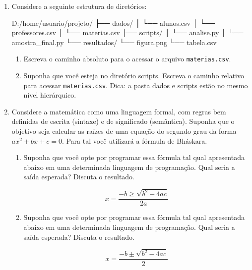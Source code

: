 \documentclass[
  brazilian,
  letterpaper,
  DIV=11,
  numbers=noendperiod]{scrreprt}
\newenvironment{Shaded}{\begin{snugshade}}{\end{snugshade}}
\newcommand{\NormalTok}[1]{\textcolor[rgb]{0.00,0.23,0.31}{#1}}
\providecommand{\tightlist}{%
  \setlength{\itemsep}{0pt}\setlength{\parskip}{0pt}}
\begin{document}
\begin{enumerate}
\def\labelenumi{\arabic{enumi}.}
\setcounter{enumi}{3}
\item
  Considere a seguinte estrutura de diretórios:

\begin{Shaded}
\begin{Highlighting}[]
\NormalTok{D:/home/usuario/projeto/}
\NormalTok{├── dados/}
\NormalTok{│   └── alunos.csv}
\NormalTok{│   └── professores.csv}
\NormalTok{│   └── materias.csv}
\NormalTok{├── scripts/}
\NormalTok{│   └── analise.py}
\NormalTok{│   └── amostra\_final.py}
\NormalTok{└── resultados/}
\NormalTok{   └── figura.png}
\NormalTok{   └── tabela.csv}
\end{Highlighting}
\end{Shaded}

  \begin{enumerate}
  \def\labelenumii{\alph{enumii}.}
  \tightlist
  \item
    Escreva o caminho absoluto para o acessar o arquivo
    \texttt{materias.csv}.
  \item
    Suponha que você esteja no diretório scripts. Escreva o caminho
    relativo para acessar \texttt{materias.csv}. Dica: a pasta dados e
    scripts estão no mesmo nível hierárquico.
  \end{enumerate}
\item
  Considere a matemática como uma linguagem formal, com regras bem
  definidas de escrita (sintaxe) e de significado (semântica). Suponha
  que o objetivo seja calcular as raízes de uma equação do segundo grau
  da forma \(ax^2 + bx + c = 0\). Para tal você utilizará a fórmula de
  Bháskara.

  \begin{enumerate}
  \def\labelenumii{\alph{enumii}.}
  \item
    Suponha que você opte por programar essa fórmula tal qual
    apresentada abaixo em uma determinada linguagem de programação. Qual
    seria a saída esperada? Discuta o resultado.

    \[x = \frac{-b \ge \sqrt{b^2 - 4ac}}{2a}\]
  \item
    Suponha que você opte por programar essa fórmula tal qual
    apresentada abaixo em uma determinada linguagem de programação. Qual
    seria a saída esperada? Discuta o resultado.

    \[x = \frac{-b \pm \sqrt{b^2 - 4ac}}{2}\]
  \end{enumerate}
\end{enumerate}
\end{document}
